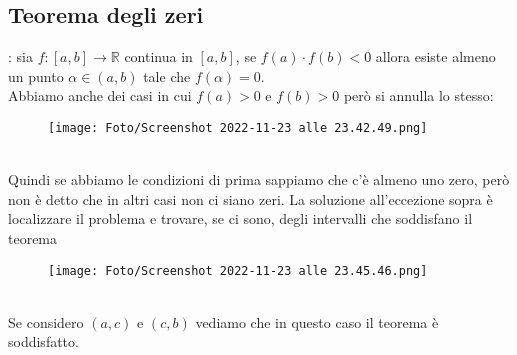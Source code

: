 \documentclass[a4paper, portrait]{book}
\numberwithin{equation}{chapter} %
\begin{document}
\subsection*{Teorema degli zeri}: sia $f:[a,b] \rightarrow \mathbb{R}$ continua in $[a,b]$, se $f(a)\cdot f(b) < 0$ allora esiste almeno un punto $\alpha \in (a,b)$ tale che $f(\alpha) = 0$.\\
Abbiamo anche dei casi in cui $f(a) > 0$ e $f(b) > 0$ però si annulla lo stesso:
\begin{figure}[h!]
    \centering
    \texttt{[image: Foto/Screenshot 2022-11-23 alle 23.42.49.png]}
    \caption{}
\end{figure}
\\Quindi se abbiamo le condizioni di prima sappiamo che c'è almeno uno zero, però non è detto che in altri casi non ci siano zeri. La soluzione all'eccezione sopra è localizzare il problema e trovare, se ci sono, degli intervalli che soddisfano il teorema
\begin{figure}[h!]
    \centering
    \texttt{[image: Foto/Screenshot 2022-11-23 alle 23.45.46.png]}
    \caption{}
\end{figure}
\\Se considero $(a,c)$ e $(c,b)$ vediamo che in questo caso il teorema è soddisfatto.
\newpage
\end{document}
